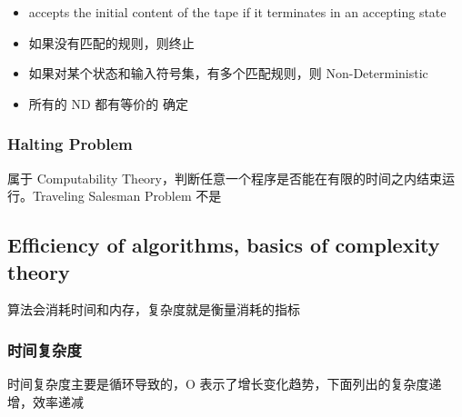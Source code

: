 \documentclass[11pt,journal,compsoc]{IEEEtran}
\begin{document}
\begin{itemize}
    \item accepts the initial content of the tape if it terminates in an accepting state

    \item 如果没有匹配的规则，则终止

    \item 如果对某个状态和输入符号集，有多个匹配规则，则 Non-Deterministic

    \item 所有的 ND 都有等价的 确定
\end{itemize}


\subsubsection{Halting Problem}

属于 Computability Theory，判断任意一个程序是否能在有限的时间之内结束运行。Traveling Salesman Problem 不是


\subsection{Efficiency of algorithms, basics of complexity theory}

算法会消耗时间和内存，复杂度就是衡量消耗的指标


\subsubsection{时间复杂度}

时间复杂度主要是循环导致的，O 表示了增长变化趋势，下面列出的复杂度递增，效率递减
\end{document}
